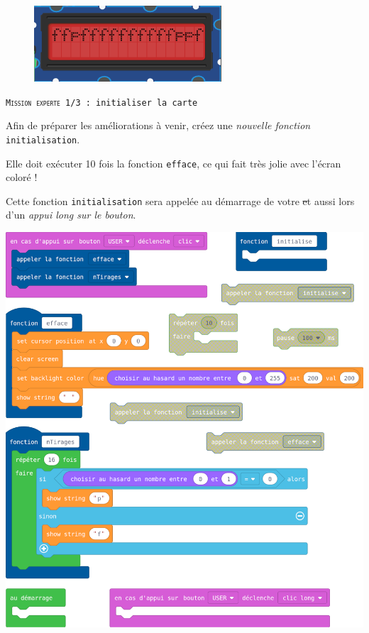 %
%
\begin{figure}
    \includegraphics[width=\linewidth]{res/st-pf-02.png}
\end{figure}

\begin{eleve}    
    \texttt{\textsc{Mission experte 1/3} : initialiser la carte}
    
    
    \begin{minipage}[t]{0.2\linewidth}
        Afin de préparer les améliorations à venir, créez une \emph{nouvelle fonction} \texttt{initialisation}.
        
        Elle doit exécuter 10 fois la fonction \texttt{efface}, ce qui fait très jolie avec l'écran coloré !
        
        Cette fonction \texttt{initialisation} sera appelée au démarrage de votre \st et aussi lors d'un \emph{appui long sur le bouton}.
    \end{minipage}
    \hfill
    \begin{minipage}[t]{0.75\linewidth}
        \vspace{0pt}
        \centerline{
            \includegraphics[width=\linewidth]{res/st-pf-03-eleve.png}}
    \end{minipage}
    

\end{eleve}

